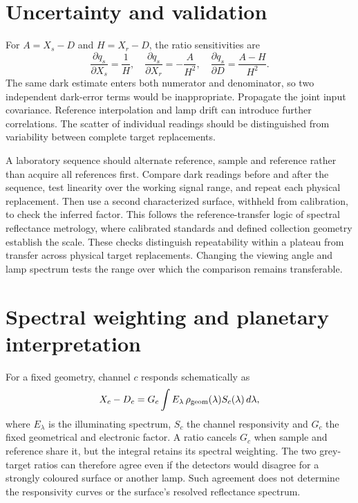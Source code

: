 \section{Uncertainty and validation}
For $A=X_s-D$ and $H=X_r-D$, the ratio sensitivities are
\begin{equation}
 \frac{\partial q_s}{\partial X_s}=\frac{1}{H},\quad
 \frac{\partial q_s}{\partial X_r}=-\frac{A}{H^2},\quad
 \frac{\partial q_s}{\partial D}=\frac{A-H}{H^2}.
 \label{eq:alb-sensitivity}
\end{equation}
The same dark estimate enters both numerator and denominator, so two independent dark-error terms would be inappropriate. Propagate the joint input covariance. Reference interpolation and lamp drift can introduce further correlations. The scatter of individual readings should be distinguished from variability between complete target replacements.

A laboratory sequence should alternate reference, sample and reference rather than acquire all references first. Compare dark readings before and after the sequence, test linearity over the working signal range, and repeat each physical replacement. Then use a second characterized surface, withheld from calibration, to check the inferred factor. This follows the reference-transfer logic of spectral reflectance metrology, where calibrated standards and defined collection geometry establish the scale\cite{barnes1998}. These checks distinguish repeatability within a plateau from transfer across physical target replacements. Changing the viewing angle and lamp spectrum tests the range over which the comparison remains transferable.

\section{Spectral weighting and planetary interpretation}
For a fixed geometry, channel $c$ responds schematically as
\begin{equation}
 X_c-D_c=G_c\int E_\lambda\,\rho_{\rm geom}(\lambda)
 S_c(\lambda)\,d\lambda,
 \label{eq:alb-spectral}
\end{equation}
where $E_\lambda$ is the illuminating spectrum, $S_c$ the channel responsivity and $G_c$ the fixed geometrical and electronic factor. A ratio cancels $G_c$ when sample and reference share it, but the integral retains its spectral weighting. The two grey-target ratios can therefore agree even if the detectors would disagree for a strongly coloured surface or another lamp. Such agreement does not determine the responsivity curves or the surface's resolved reflectance spectrum.

